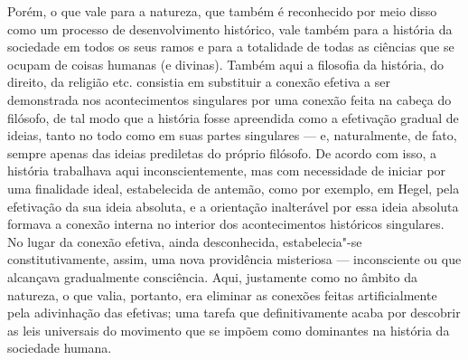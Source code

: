 Porém, o que vale para a natureza, que também é reconhecido por meio
disso como um processo de desenvolvimento histórico, vale também para a
história da sociedade em todos os seus ramos e para a totalidade de
todas as ciências que se ocupam de coisas humanas (e divinas). Também
aqui a filosofia da história, do direito, da religião etc. consistia em
substituir a conexão efetiva a ser demonstrada nos acontecimentos
singulares por uma conexão feita na cabeça do 
filósofo, de tal modo que a história fosse apreendida como a efetivação gradual de ideias, tanto no todo
como em suas partes singulares --- e, naturalmente,
de fato, sempre apenas das ideias prediletas do próprio %
filósofo. De acordo com isso, a história trabalhava aqui
inconscientemente, mas com necessidade de iniciar por uma finalidade
ideal, estabelecida de antemão, como por exemplo,
em Hegel,
pela efetivação da sua ideia absoluta, e a orientação inalterável por
essa ideia absoluta formava a conexão interna no interior dos
acontecimentos históricos singulares. No lugar da conexão efetiva, ainda
desconhecida, estabelecia"-se constitutivamente, assim,
uma nova providência misteriosa --- inconsciente ou que alcançava gradualmente consciência.
Aqui, justamente como no âmbito da natureza, o
que valia, portanto, era eliminar as conexões feitas artificialmente
pela adivinhação  das efetivas; uma tarefa que
definitivamente acaba por descobrir as leis universais do movimento que
se impõem como dominantes na história da sociedade humana.

